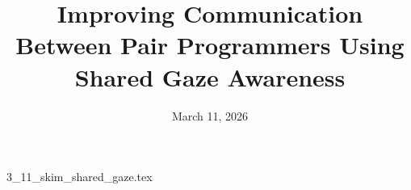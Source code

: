 \documentclass{article}      %
\title{Improving Communication Between Pair Programmers Using Shared Gaze Awareness}  %
\date{March 11, 2026}
\begin{document}

\maketitle                   %



{3_11_skim_shared_gaze.tex}
\printbibliography
\end{document}
